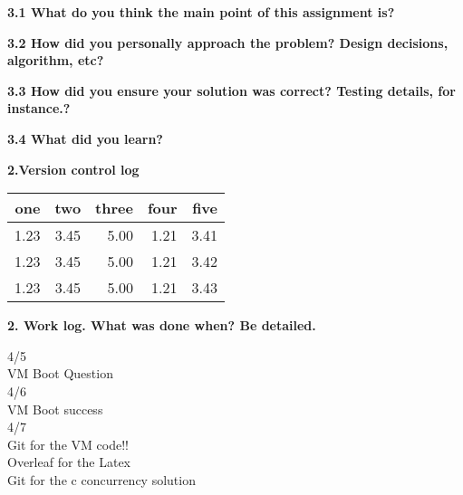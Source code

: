 \documentclass[english,10pt]{article}
\begin{document}
\begin{singlespace}
\begin{center}
{\bf 3.1 What do you think the main point of this assignment is?}
\end{center}


\begin{center}
{\bf 3.2 How did you personally approach the problem? Design decisions, algorithm, etc?}
\end{center}


\begin{center}
{\bf 3.3 How did you ensure your solution was correct? Testing details, for instance.?}
\end{center}

\begin{center}
{\bf 3.4 What did you learn?}
\end{center}


\begin{center}
{\bf 2.Version control log}
\end{center}
\begin{tabular}{rrrrr}
one & two & three & four & five\\\hline
1.23 & 3.45 & 5.00 & 1.21 & 3.41 \\
1.23 & 3.45 & 5.00 & 1.21 & 3.42 \\
1.23 & 3.45 & 5.00 & 1.21 & 3.43 \\
\end{tabular}  

\begin{center}
{\bf 2. Work log. What was done when? Be detailed.}
\end{center}
4/5\\
VM Boot Question\\
4/6\\
VM Boot success\\
4/7\\
Git for the VM code!!\\
Overleaf for the Latex\\
Git for the c concurrency solution\\

\end{singlespace}
 
\end{document}
